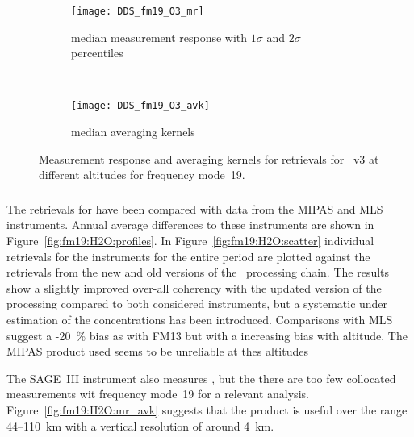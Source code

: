 \begin{figure}[tbhp]
    \centering
    \begin{subfigure}[b]{0.49\textwidth}
        \texttt{[image: DDS\_fm19\_O3\_mr]}
        \caption{median measurement response with $1\sigma$ and $2\sigma$
        percentiles}
        \label{fig:fm19:O3:mr}
    \end{subfigure}
    \,
    \begin{subfigure}[b]{0.49\textwidth}
        \texttt{[image: DDS\_fm19\_O3\_avk]}
        \caption{median averaging kernels\newline~}
        \label{fig:fm19:O3:avk}
    \end{subfigure}
    \caption{Measurement response and averaging kernels for 
    retrievals for \smr~v3 at different altitudes for frequency mode~19.}
    \label{fig:fm19:O3:mr_avk}
\end{figure}



\subsubsection{}
\label{sec:fm19:comparison:H2O}
The retrievals for  have been compared with data from the MIPAS and
MLS instruments.  Annual average differences to these instruments are shown in
Figure~\ref{fig:fm19:H2O:profiles}. In Figure~\ref{fig:fm19:H2O:scatter}
individual retrievals for the instruments for the entire period are plotted
against the retrievals from the new and old versions of the \smr\ processing
chain. The results show a slightly improved over-all coherency with the
updated version of the processing compared to both considered instruments, but
a systematic under estimation of the concentrations has been introduced.
Comparisons with MLS suggest a -20~\% bias as with FM13 but with a increasing
bias with altitude.  The MIPAS product used seems to be unreliable at thes
altitudes

The SAGE~III instrument also measures , but the there are too few
collocated measurements wit frequency mode~19 for a relevant analysis.
Figure~\ref{fig:fm19:H2O:mr_avk} suggests that the product is useful over the
range 44--110~km with a vertical resolution of around 4~km.

